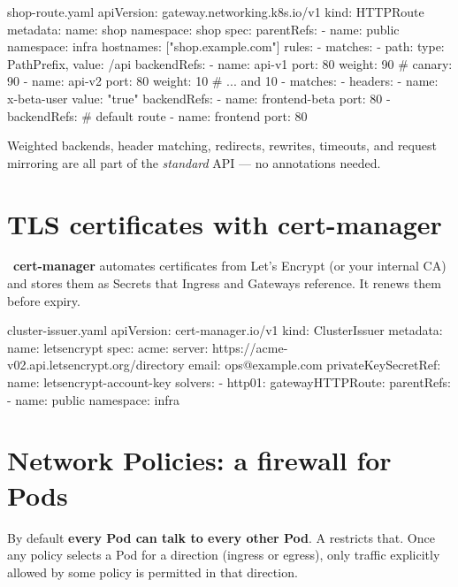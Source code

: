 \begin{yamlcode}{shop-route.yaml}
apiVersion: gateway.networking.k8s.io/v1
kind: HTTPRoute
metadata:
  name: shop
  namespace: shop
spec:
  parentRefs:
    - name: public
      namespace: infra
  hostnames: ["shop.example.com"]
  rules:
    - matches:
        - path: { type: PathPrefix, value: /api }
      backendRefs:
        - name: api-v1
          port: 80
          weight: 90                   # canary: 90%
        - name: api-v2
          port: 80
          weight: 10                   # ... and 10%
    - matches:
        - headers:
            - name: x-beta-user
              value: "true"
      backendRefs:
        - name: frontend-beta
          port: 80
    - backendRefs:                     # default route
        - name: frontend
          port: 80
\end{yamlcode}

Weighted backends, header matching, redirects, rewrites, timeouts, and request
mirroring are all part of the \emph{standard} API --- no annotations needed.

\section{TLS certificates with cert-manager}

~\textbf{cert-manager} automates certificates from Let's
Encrypt (or your internal CA) and stores them as Secrets that Ingress and
Gateways reference. It renews them before expiry.

\begin{yamlcode}{cluster-issuer.yaml}
apiVersion: cert-manager.io/v1
kind: ClusterIssuer
metadata:
  name: letsencrypt
spec:
  acme:
    server: https://acme-v02.api.letsencrypt.org/directory
    email: ops@example.com
    privateKeySecretRef:
      name: letsencrypt-account-key
    solvers:
      - http01:
          gatewayHTTPRoute:
            parentRefs:
              - name: public
                namespace: infra
\end{yamlcode}

\section{Network Policies: a firewall for Pods}

By default \textbf{every Pod can talk to every other Pod}. A
 restricts that. Once any policy selects a Pod for a
direction (ingress or egress), only traffic explicitly allowed by some policy
is permitted in that direction.

